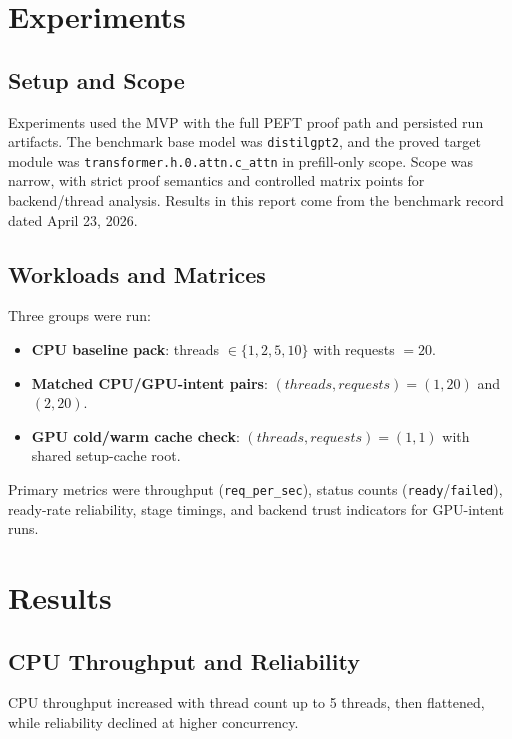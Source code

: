 \documentclass[manuscript,nonacm]{acmart}
\begin{document}
\section{Experiments}

\subsection{Setup and Scope}

Experiments used the MVP with the full PEFT proof path and persisted run artifacts. The benchmark base model was \texttt{distilgpt2}, and the proved target module was \texttt{transformer.h.0.attn.c\_attn} in prefill-only scope. Scope was narrow, with strict proof semantics and controlled matrix points for backend/thread analysis. Results in this report come from the benchmark record dated April 23, 2026.

\subsection{Workloads and Matrices}

Three groups were run:

\begin{itemize}
    \item \textbf{CPU baseline pack}: threads $\in \{1,2,5,10\}$ with requests $=20$.
    \item \textbf{Matched CPU/GPU-intent pairs}: $(threads,requests)=(1,20)$ and $(2,20)$.
    \item \textbf{GPU cold/warm cache check}: $(threads,requests)=(1,1)$ with shared setup-cache root.
\end{itemize}

Primary metrics were throughput (\texttt{req\_per\_sec}), status counts (\texttt{ready}/\texttt{failed}), ready-rate reliability, stage timings, and backend trust indicators for GPU-intent runs.

\section{Results}

\subsection{CPU Throughput and Reliability}

CPU throughput increased with thread count up to 5 threads, then flattened, while reliability declined at higher concurrency.
\end{document}
